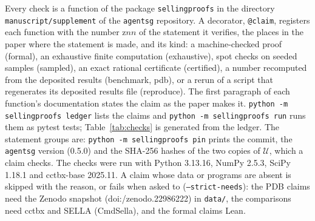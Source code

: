 \documentclass[preprint,pdf]{iucr}          %
\begin{document}
{\sloppy Every check is a function of the package \texttt{sellingproofs} in the directory \texttt{manuscript/\allowbreak supplement} of the \texttt{agentsg} repository. A decorator, \texttt{@claim}, registers each function with the number z$nn$ of the statement it verifies, the places in the paper where the statement is made, and its kind: a machine-checked proof (formal), an exhaustive finite computation (exhaustive), spot checks on seeded samples (sampled), an exact rational certificate (certified), a number recomputed from the deposited results (benchmark, pdb), or a rerun of a script that regenerates its deposited results file (reproduce). The first paragraph of each function's documentation states the claim as the paper makes it. \texttt{python -m sellingproofs ledger} lists the claims and \texttt{python -m sellingproofs run} runs them as pytest tests; Table~\ref{tab:checks} is generated from the ledger. The statement groups are:  \texttt{python -m sellingproofs pin} prints the commit, the \texttt{agentsg} version (0.5.0) and the SHA-256 hashes of the two copies of $\mathcal U$, which a claim checks. The checks were run with Python 3.13.16, NumPy 2.5.3, SciPy 1.18.1 and cctbx-base 2025.11. A claim whose data or programs are absent is skipped with the reason, or fails when asked to (\texttt{--strict-needs}): the PDB claims need the Zenodo snapshot (doi:/\allowbreak zenodo.22986222) in \texttt{data/}, the comparisons need cctbx and SELLA (CmdSella), and the formal claims Lean.\par}
\end{document}
